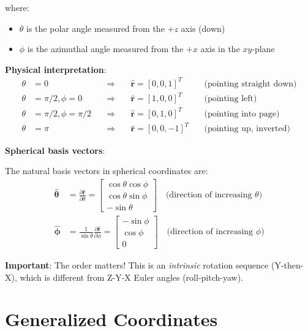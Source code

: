 \documentclass[12pt]{article}
\begin{document}
where:
\begin{itemize}
    \item $\theta$ is the polar angle measured from the $+z$ axis (down)
    \item $\phi$ is the azimuthal angle measured from the $+x$ axis in the $xy$-plane
\end{itemize}

\textbf{Physical interpretation}:
\begin{align}
    \theta &= 0 \quad &\Rightarrow \quad &\hat{\mathbf{r}} = [0, 0, 1]^T \quad &\text{(pointing straight down)} \\
    \theta &= \pi/2, \phi = 0 \quad &\Rightarrow \quad &\hat{\mathbf{r}} = [1, 0, 0]^T \quad &\text{(pointing left)} \\
    \theta &= \pi/2, \phi = \pi/2 \quad &\Rightarrow \quad &\hat{\mathbf{r}} = [0, 1, 0]^T \quad &\text{(pointing into page)} \\
    \theta &= \pi \quad &\Rightarrow \quad &\hat{\mathbf{r}} = [0, 0, -1]^T \quad &\text{(pointing up, inverted)}
\end{align}

\textbf{Spherical basis vectors}:

The natural basis vectors in spherical coordinates are:
\begin{align}
    \hat{\boldsymbol{\theta}} &= \frac{\partial \hat{\mathbf{r}}}{\partial \theta} = 
    \begin{bmatrix}
        \cos\theta\cos\phi \\
        \cos\theta\sin\phi \\
        -\sin\theta
    \end{bmatrix}
    \quad \text{(direction of increasing $\theta$)} \\
    \hat{\boldsymbol{\phi}} &= \frac{1}{\sin\theta}\frac{\partial \hat{\mathbf{r}}}{\partial \phi} = 
    \begin{bmatrix}
        -\sin\phi \\
        \cos\phi \\
        0
    \end{bmatrix}
    \quad \text{(direction of increasing $\phi$)}
\end{align}

\textbf{Important}: The order matters! This is an \textit{intrinsic} rotation sequence (Y-then-X), which is different from Z-Y-X Euler angles (roll-pitch-yaw).

\section{Generalized Coordinates}
\end{document}
